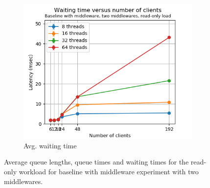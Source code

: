 \documentclass[11pt,a4paper]{article}
\begin{document}
\begin{figure}[h]
\begin{subfigure}{.33\textwidth}
\end{subfigure}%
\begin{subfigure}{.33\textwidth}
  \centering
  \includegraphics[width=1.0\linewidth,trim={0px 0px 0px 0px},clip]{img/plot/mwb2-ro-wtime-mini.png}
  \caption{Avg. waiting time}
  \label{fig:mwb2-ro-wtime-mini}
\end{subfigure}
\caption{Average queue lengths, queue times and waiting times for the read-only workload for baseline with middleware experiment with two middlewares.}
\label{fig:mwb2-ro-mini}
\end{figure}
\end{document}
